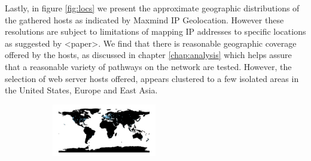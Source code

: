 \documentclass{l4proj}
\begin{document}
Lastly, in figure \ref{fig:locs} we present the approximate geographic distributions of the gathered hosts as indicated by Maxmind IP Geolocation. However these resolutions are subject to limitations of mapping IP addresses to specific locations as suggested by <paper>. We find that there is reasonable geographic coverage offered by the hosts, as discussed in chapter \ref{chap:analysis} which helps assure that a reasonable variety of pathways on the network are tested. However, the selection of web server hosts offered, appears clustered to a few isolated areas in the United States, Europe and East Asia.

\begin{figure}[H]
    \centering
    
    \begin{subfigure}[b]{\textwidth}
         \centering
         \includegraphics[width=0.5\textwidth]{dissertation/images/ntp.locs.map.pdf}
         \caption{}
     \end{subfigure}
     

\end{figure}
\end{document}
